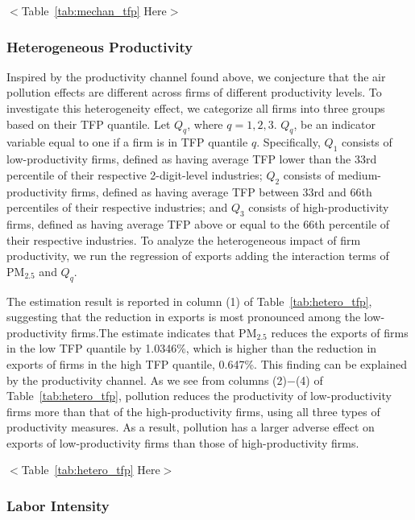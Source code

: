 \documentclass[12pt]{article}
\begin{document}
\begin{center}
$<$Table~\ref{tab:mechan_tfp} Here$>$
\end{center}

\subsubsection{Heterogeneous Productivity}

Inspired by the productivity channel found above, we conjecture that the air pollution effects are different across firms of different
productivity levels. To investigate this heterogeneity effect, we categorize all firms into three groups based on their TFP quantile. Let $Q_{q}$, where $q = 1, 2, 3$. $Q_{q}$, be an indicator variable equal to one if a firm is in TFP quantile $q$. Specifically, $Q_{1}$ consists of low-productivity firms, defined as having average TFP lower than the 33rd percentile of their respective 2-digit-level industries; $Q_{2}$ consists of medium-productivity firms, defined as having average TFP between 33rd and 66th percentiles of their respective industries; and $Q_{3}$ consists of high-productivity firms, defined as having average TFP above or equal to the 66th percentile of their respective industries. To analyze the heterogeneous impact of firm productivity, we run the regression of exports adding the interaction terms of $\mathrm{PM_{2.5}}$ and $Q_{q}$.

The estimation result is reported in column (1) of Table~\ref{tab:hetero_tfp}, suggesting that the reduction in exports is most pronounced among the low-productivity firms.The estimate indicates that $\mathrm{PM_{2.5}}$ reduces the exports of firms in the low TFP quantile by 1.0346\%, which is higher than the reduction in exports of firms in the high TFP quantile, 0.647\%. This finding can be explained by the productivity channel. As we see from columns (2)$-$(4) of Table~\ref{tab:hetero_tfp}, pollution reduces the productivity of low-productivity firms more than that of the high-productivity firms, using all three types of productivity measures. As a result, pollution has a larger adverse effect on exports of low-productivity firms than those of high-productivity firms.   

\begin{center}
$<$Table~\ref{tab:hetero_tfp} Here$>$
\end{center}

\subsubsection{Labor Intensity}
\end{document}
